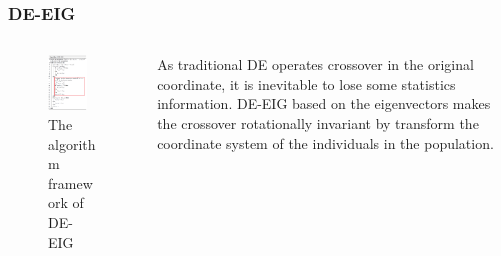 \documentclass[xcolor=dvipsnames]{beamer}
\begin{document}
    \begin{frame}
    \frametitle{DE-EIG}
    \begin{columns}
        \begin{column}{0.5\textwidth}
        \begin{figure}[H]
            \graphicspath{{figs/}}
            \includegraphics[width=0.8\textwidth]{de-eig.png}
            \caption{The algorithm framework of DE-EIG}
        \end{figure}
    \end{column}
    \begin{column}{0.5\textwidth}
    As traditional DE operates crossover in the original coordinate, it is inevitable to lose some statistics information. DE-EIG based on the eigenvectors makes the crossover rotationally invariant by transform the coordinate system of the individuals in the population.
    \end{column}
    \end{columns}
    \end{frame}
\end{document}
